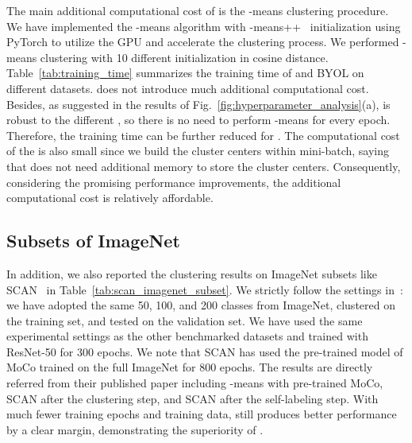 The main additional computational cost of \methodname is the -means clustering procedure. We have implemented the -means algorithm with -means++~\cite{arthur2006k} initialization using PyTorch to utilize the GPU and accelerate the clustering process. We performed -means clustering with 10 different initialization in cosine distance. Table~\ref{tab:training_time} summarizes the training time of \methodname and BYOL on different datasets. \methodname does not introduce much additional computational cost.
Besides, as suggested in the results of Fig.~\ref{fig:hyperparameter_analysis}(a), \methodname is robust to the different , so there is no need to perform -means for every epoch. Therefore, the training time can be further reduced for \methodname. The computational cost of the \lossname is also small since we build the cluster centers within mini-batch, saying that \methodname does not need additional memory to store the cluster centers. Consequently, considering the promising performance improvements, the additional computational cost is relatively affordable.

\subsection{Subsets of ImageNet}

In addition, we also reported the clustering results on ImageNet subsets like SCAN~\cite{van2020scan} in Table~\ref{tab:scan_imagenet_subset}.
We strictly follow the settings in~\cite{van2020scan}: we have adopted the same 50, 100, and 200 classes from ImageNet, clustered on the training set, and tested on the validation set. We have used the same experimental settings as the other benchmarked datasets and trained \methodname with ResNet-50 for 300 epochs. We note that SCAN has used the pre-trained model of MoCo trained on the full ImageNet for 800 epochs. The results are directly referred from their published paper including -means with pre-trained MoCo, SCAN after the clustering step, and SCAN after the self-labeling step. With much fewer training epochs and training data, \methodname still produces better performance by a clear margin, demonstrating the superiority of \methodname.

